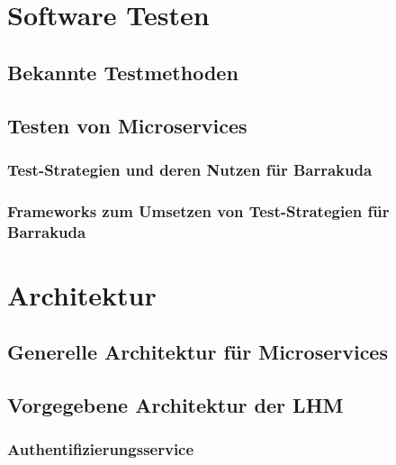\documentclass[12pt,a4paper,bibliography=totocnumbered,listof=totocnumbered]{scrartcl}
\begin{document}

\section{Software Testen}

\subsection{Bekannte Testmethoden}

\subsection{Testen von Microservices}

\subsubsection{Test-Strategien und deren Nutzen für Barrakuda}

\subsubsection{Frameworks zum Umsetzen von Test-Strategien für Barrakuda}

\section{Architektur}

\subsection{Generelle Architektur für Microservices}

\subsection{Vorgegebene Architektur der LHM}

\subsubsection{Authentifizierungsservice}
\end{document}
